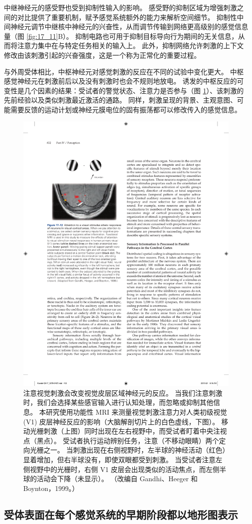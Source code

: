 中继神经元的感受野也受到抑制性输入的影响。 
感受野的抑制区域为增强刺激之间的对比提供了重要机制，赋予感觉系统额外的能力来解析空间细节。 
抑制性中间神经元调节中继核中神经元的兴奋性，从而调节传输到网络更高级别的感觉信息量（图 \ref{fig:17_11}B）。 
抑制电路也可用于抑制目标导向行为期间的无关信息，从而将注意力集中在与特定任务相关的输入上。 
此外，抑制网络允许刺激的上下文修改由该刺激引起的兴奋强度，这是一个称为正常化的重要过程。


与外周受体相比，中枢神经元对感觉刺激的反应在不同的试验中变化更大。 
中枢感觉神经元在刺激前后以及没有刺激时也会不规则地放电。 
诱发的中枢反应的可变性是几个因素的结果：受试者的警觉状态、注意力是否参与（图 \ref{fig:17_12}）、该刺激的先前经验以及类似刺激最近激活的通路。 
同样，刺激呈现的背景、主观意图、可能需要反馈的运动计划或神经元膜电位的固有振荡都可以修改传入的感觉信息。


\begin{figure}[htbp]
	\centering
	\includegraphics[width=0.5\linewidth]{chap17/fig_17_12}
	\caption{注意视觉刺激会改变视觉皮层区域神经元的反应。 
		当我们注意刺激时，我们会选择某些感官输入进行认知处理，而忽略或抑制其他信息。
		本研究使用功能性 MRI 来测量视觉刺激注意力对人类初级视觉 (V1) 皮层神经反应的影响（大脑解剖切片上的白色虚线，下图）。 
		移动光栅刺激（上图）同时出现在左右视野中，而受试者盯着中央注视点（黑点）。 
		受试者执行运动辨别任务，注意（不移动眼睛）两个定向光栅之一。 
		当刺激出现在右侧视野时，左半球的神经活动（红色）显着增加，但右半球没有，即使双眼都受到刺激。 
		当受试者注意左侧视野中的光栅时，右侧 V1 皮层会出现类似的活动焦点，而左侧半球的活动会下降（未显示）。 （改编自 Gandhi、Heeger 和 Boynton，1999。）}
	\label{fig:17_12}
\end{figure}


\subsection{受体表面在每个感觉系统的早期阶段都以地形图表示}

